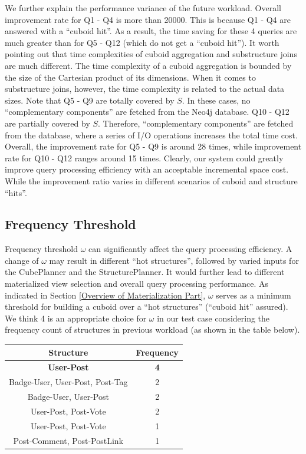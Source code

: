 We further explain the performance variance of the future workload. Overall improvement rate for Q1 - Q4 is more than 20000. This is because Q1 - Q4 are answered with a ``cuboid hit''. As a result, the time saving for these 4 queries are much greater than for Q5 - Q12 (which do not get a ``cuboid hit''). It worth pointing out that time complexities of cuboid aggregation and substructure joins are much different. The time complexity of a cuboid aggregation is bounded by the size of the Cartesian product of its dimensions. When it comes to substructure joins, however, the time complexity is related to the actual data sizes. Note that Q5 - Q9 are totally covered by $S$. In these cases, no ``complementary components'' are fetched from the Neo4j database.  Q10 - Q12 are partially covered by $S$.  Therefore, ``complementary components'' are fetched from the database, where a series of I/O operations increases the total time cost.  Overall, the improvement rate for Q5 - Q9 is around 28 times, while improvement rate for Q10 - Q12 ranges around 15 times. Clearly, our system could greatly improve query processing efficiency with an acceptable incremental space cost. While the improvement ratio varies in different scenarios of cuboid and structure ``hits''.




\subsection{Frequency Threshold}
\label{Frequency Threshold}
Frequency threshold $\omega$ can significantly affect the query processing efficiency. A change of $\omega$ may result in different ``hot structures'', followed by varied inputs for the CubePlanner and the StructurePlanner. It would further lead to different materialized view selection and overall query processing performance. As indicated in Section \ref{Overview of Materialization Part}, $\omega$ serves as a minimum threshold for building a cuboid over a ``hot structures'' (``cuboid hit'' assured). We think 4 is an appropriate choice for $\omega$ in our test case considering the frequency count of structures in previous workload (as shown in the table below).

\begin{center}
	\begin{tabular}{ | c | c |}
		\hline
		Structure	&Frequency	\\ \hline
		\textbf{User-Post} 	&\textbf{4} \\ \hline
		Badge-User, User-Post, Post-Tag 	&2 \\ \hline
		Badge-User, User-Post	&2 \\ \hline
		User-Post, Post-Vote	&2 \\ \hline
		User-Post, Post-Vote	&1 \\ \hline
		Post-Comment, Post-PostLink	&1 \\ \hline
	\end{tabular}
	\end {center}
	
